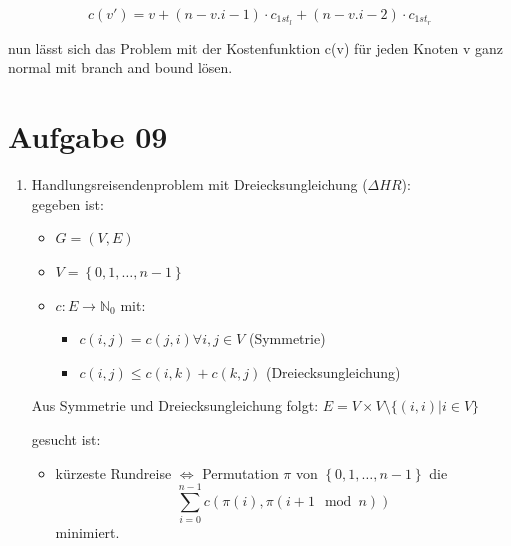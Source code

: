 \documentclass[10pt,a4paper]{article}
\begin{document}
    $$
        c(v') = v + (n-v.i-1) \cdot c_{1st_l} + (n-v.i-2) \cdot c_{1st_r}
    $$

    nun l\"asst sich das Problem mit der Kostenfunktion c(v) f\"ur jeden
    Knoten v ganz normal mit branch and bound l\"osen.




\section*{Aufgabe 09}
    \begin{enumerate}[label={\alph*)}]
        \item Handlungsreisendenproblem mit Dreiecksungleichung ($\Delta HR$): \\
            gegeben ist:
            \begin{itemize}
                \item $G = (V,E)$
                \item $V = \left\{0,1,\ldots, n-1\right\}$
                \item $c: E \rightarrow \mathbb{N}_0 $ mit:
                    \begin{itemize}
                        \item $c(i,j) = c(j,i) \forall i,j \in V$ (Symmetrie)
                        \item $c(i,j) \leq c(i,k) + c(k,j)$ (Dreiecksungleichung)
                    \end{itemize}

            \end{itemize}

            Aus Symmetrie und Dreiecksungleichung folgt: $E = V \times V
            \setminus \{ (i,i) | i \in V \} $

            gesucht ist:
            \begin{itemize}
                \item kürzeste Rundreise $\Leftrightarrow$
                    Permutation $\pi$ von $\left\{0,1,\ldots, n-1\right\}$ die
                    $$
                        \sum_{i=0}^{n-1} c(\pi(i), \pi(i+1 \mod n))
                    $$
                    minimiert.
            \end{itemize}


\end{enumerate}
\end{document}
